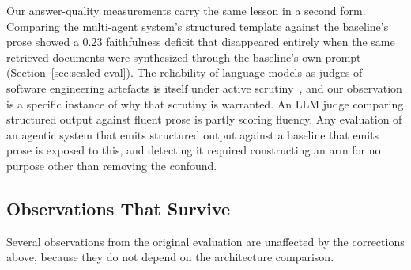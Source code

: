 \documentclass[acmsmall,review,anonymous,screen]{acmart}
\begin{document}
Our answer-quality measurements carry the same lesson in a second form.
Comparing the multi-agent system's structured template against the baseline's
prose showed a 0.23 faithfulness deficit that disappeared entirely when the same
retrieved documents were synthesized through the baseline's own prompt
(Section~\ref{sec:scaled-eval}). The reliability of language models as judges of
software engineering artefacts is itself under active
scrutiny~\cite{wang2025llmjudge,crupi2025judge,he2026judgese,zhou2025sejury}, and
our observation is a specific instance of why that scrutiny is
warranted. An LLM judge comparing structured output
against fluent prose is partly scoring fluency. Any evaluation of an agentic
system that emits structured output against a baseline that emits prose is
exposed to this, and detecting it required constructing an arm for no purpose
other than removing the confound.

\subsection{Observations That Survive}\label{sec:survives}

Several observations from the original evaluation are unaffected by the
corrections above, because they do not depend on the architecture comparison.
\end{document}
